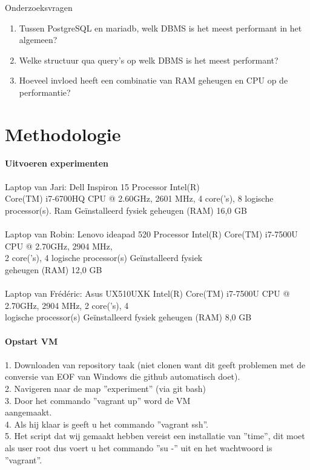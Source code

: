 \documentclass[fleqn,10pt]{artikeltin}
\begin{document}
Onderzoeksvragen
\begin{enumerate}  
    \item Tussen PostgreSQL en mariadb, welk DBMS is het meest performant in het algemeen?
    \item Welke structuur qua query's op welk DBMS is het meest performant?
    \item Hoeveel invloed heeft een combinatie van RAM geheugen en CPU op de performantie?
\end{enumerate}

\section{Methodologie}
\label{sec:methodologie}

\textbf{Uitvoeren experimenten}\\\\
Laptop van Jari: Dell Inspiron 15 
Processor Intel(R)\\Core(TM) i7-6700HQ CPU @ 2.60GHz, 2601 MHz, 4 core('s), 8 logische processor(s). 
Ram Geïnstalleerd fysiek geheugen (RAM)	16,0 GB\\\\
Laptop van Robin: Lenovo ideapad 520
Processor Intel(R) Core(TM) i7-7500U CPU @ 2.70GHz, 2904 MHz,\\ 2 core('s), 4 logische processor(s)
Geïnstalleerd fysiek \\geheugen (RAM)	12,0 GB\\\\
Laptop van Frédéric: Asus UX510UXK
Intel(R) Core(TM) i7-7500U CPU @ 2.70GHz, 2904 MHz, 2 core('s), 4 \\logische processor(s)
Geïnstalleerd fysiek geheugen (RAM)	8,0 GB\\\\
\textbf{Opstart VM}\\\\
1. Downloaden van repository taak (niet clonen want dit geeft problemen met de conversie van EOF van Windows die github automatisch doet).\\
2. Navigeren naar de map ''experiment'' (via git bash)\\
3. Door het commando ''vagrant up'' word de VM \\aangemaakt.\\
4. Als hij klaar is geeft u het commando ''vagrant ssh''.\\
5. Het script dat wij gemaakt hebben vereist een installatie van ''time'', dit moet als user root dus voert u het commando ''su -'' uit en het wachtwoord is ''vagrant''.\\
\end{document}
